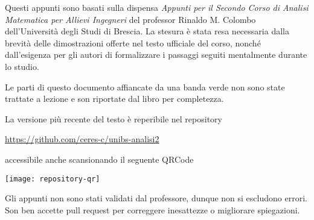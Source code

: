 \documentclass[a4paper,twoside,italian,11pt]{book}
\begin{document}
Questi appunti sono basati sulla dispensa \textit{Appunti per il Secondo Corso di Analisi Matematica per Allievi Ingegneri} del professor Rinaldo M. Colombo dell'Università degli Studi di Brescia. La stesura è stata resa necessaria dalla brevità delle dimostrazioni offerte nel testo ufficiale del corso, nonché dall'esigenza per gli autori di formalizzare i passaggi seguiti mentalmente durante lo studio.
\vspace*{\baselineskip}

\cbstart%
Le parti di questo documento affiancate da una banda verde non sono state trattate a lezione e son riportate dal libro per completezza.
\cbend%

\vfill
\noindent La versione più recente del testo è reperibile nel repository
\begin{center}
	\url{https://github.com/ceres-c/unibs-analisi2}
\end{center}
accessibile anche scansionando il seguente QRCode
\begin{center}
	\texttt{[image: repository-qr]}
\end{center}
Gli appunti non sono stati validati dal professore, dunque non si escludono errori. Son ben accette pull request per correggere inesattezze o migliorare spiegazioni.










\backmatter%
%
\cleardoublepage%
\printindex
\end{document}
